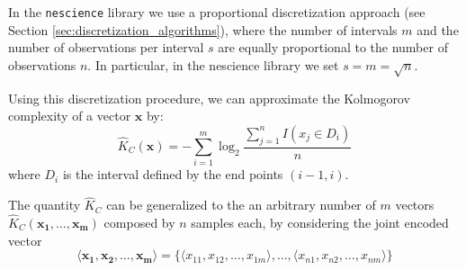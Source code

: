 In the \texttt{nescience} library we use a proportional discretization approach (see Section \ref{sec:discretization_algorithms}), where the number of intervals $m$ and the number of observations per interval $s$ are equally proportional to the number of observations $n$. In particular, in the nescience library we set $s = m = \sqrt{n}$.

Using this discretization procedure, we can approximate the Kolmogorov complexity of a vector $\mathbf{x}$ by:
\[
\hat{K}_C(\mathbf{x}) = - \sum_{i=1}^m \log_2{ \frac{ \sum_{j=1}^n I(x_j \in D_i)} {n} } 
\]
where $D_i$ is the interval defined by the end points $(i-1, i)$.

The quantity $\hat{K}_C$ can be generalized to the an arbitrary number of $m$ vectors $\hat{K}_C(\mathbf{x_1}, \ldots, \mathbf{x_m})$ composed by $n$ samples each, by considering the joint encoded vector
\[
\langle \mathbf{x_1}, \mathbf{x_2}, \ldots, \mathbf{x_m} \rangle = \{ \langle x_{11}, x_{12}, \ldots, x_{1m} \rangle, \ldots, \langle x_{n1}, x_{n2}, \ldots, x_{nm} \rangle \}
\]

